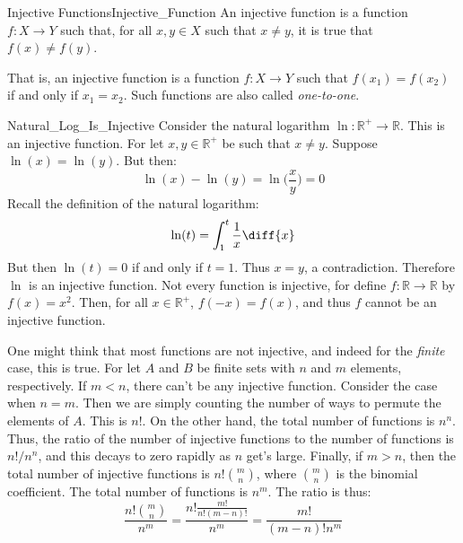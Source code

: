     \begin{ldefinition}{Injective Functions}{Injective_Function}
        An \gls{injective function} is a function
        $f:X\rightarrow{Y}$ such that, for all
        $x,y\in{X}$ such that $x\ne{y}$, it is true that
        $f(x)\ne{f}(y)$.
    \end{ldefinition}
    That is, an injective function is a function
    $f:X\rightarrow{Y}$ such that $f(x_{1})=f(x_{2})$
    if and only if $x_{1}=x_{2}$. Such functions are also
    called \textit{one-to-one}.
    \begin{lexample}{}{Natural_Log_Is_Injective}
        Consider the natural logarithm
        $\ln:\mathbb{R}^{+}\rightarrow\mathbb{R}$. This is an injective
        function. For let $x,y\in\mathbb{R}^{+}$ be such that
        $x\ne{y}$. Suppose $\ln(x)=\ln(y)$. But then:
        \begin{equation}
            \ln(x)-\ln(y)=\ln\Big(\frac{x}{y}\Big)=0
        \end{equation}
        Recall the definition of the natural logarithm:
        \begin{equation}
            \ln(t)=\int_{1}^{t}\frac{1}{x}\diff{x}
        \end{equation}
        But then $\ln(t)=0$ if and only if $t=1$. Thus $x=y$, a
        contradiction. Therefore $\ln$ is an injective function. Not
        every function is injective, for define
        $f:\mathbb{R}\rightarrow\mathbb{R}$ by $f(x)=x^{2}$. Then, for
        all $x\in\mathbb{R}^{+}$, $f(\minus{x})=f(x)$, and thus $f$
        cannot be an injective function.
    \end{lexample}
    One might think that most functions are not injective,
    and indeed for the \textit{finite} case, this is true.
    For let $A$ and $B$ be finite sets with $n$ and $m$
    elements, respectively. If $m<n$, there can't be
    any injective function. Consider the case when $n=m$.
    Then we are simply counting the number of ways to
    permute the elements of $A$. This is $n!$. On the
    other hand, the total number of functions is
    $n^{n}$. Thus, the ratio of the number of injective
    functions to the number of functions is
    $n!/n^{n}$, and this decays to zero rapidly as
    $n$ get's large. Finally, if $m>n$, then the total
    number of injective functions is
    $n!\binom{m}{n}$, where $\binom{m}{n}$ is the
    binomial coefficient. The total number of functions
    is $n^{m}$. The ratio is thus:
    \begin{equation}
        \frac{n!\binom{m}{n}}{n^{m}}=\frac{n!\frac{m!}{n!(m-n)!}}{n^{m}}
                                    =\frac{m!}{(m-n)!n^{m}}
    \end{equation}
